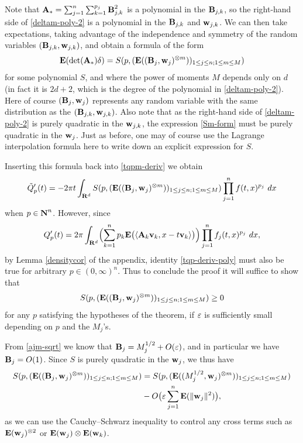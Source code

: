 Note that ${\hbox{\bf A}}_* = \sum_{j=1}^n \sum_{k=1}^{p_j} {\hbox{\bf B}}_{j,k}^2$ is a
polynomial in the ${\hbox{\bf B}}_{j,k}$, so the right-hand side of
\eqref{deltam-poly-2} is a polynomial in the ${\hbox{\bf B}}_{j,k}$ and
${\hbox{\bf w}}_{j,k}$. We can then take expectations, taking advantage of the
independence and symmetry of the random variables $({\hbox{\bf B}}_{j,k},
{\hbox{\bf w}}_{j,k})$, and obtain a formula of the form
\begin{equation}\label{Sm-form}
 {\hbox{\bf E}}(\det({\hbox{\bf A}}_*) \delta) = S(p, ({\hbox{\bf E}}( ({\hbox{\bf B}}_j, {\hbox{\bf w}}_j)^{\otimes m} ))_{1 \leq j \leq n; 1 \leq m \leq M} )
\end{equation}
for some polynomial $S$, and where the power of moments $M$
depends only on $d$ (in fact it is $2d+2$, which is the degree of
the polynomial in \eqref{deltam-poly-2}).  Here of course $({\hbox{\bf B}}_j,
{\hbox{\bf w}}_j)$ represents any random variable with the same distribution
as the $({\hbox{\bf B}}_{j,k}, {\hbox{\bf w}}_{j,k})$.  Also note that as the right-hand
side of \eqref{deltam-poly-2} is purely quadratic in the
${\hbox{\bf w}}_{j,k}$, the expression \eqref{Sm-form} must be purely quadratic in the
${\hbox{\bf w}}_j$. Just as before, one may of course use the Lagrange
interpolation formula here to write down an explicit expression
for $S$.

Inserting this formula back into \eqref{tqpm-deriv} we obtain
\begin{equation}\label{tqp-deriv-poly}
\tilde Q'_p(t) = -2\pi t \int_{{\bf R}^d}
S(p, ({\hbox{\bf E}}( ({\hbox{\bf B}}_j, {\hbox{\bf w}}_j)^{\otimes m} ))_{1 \leq j \leq n; 1 \leq m
\leq M} ) \prod_{j=1}^n f(t,x)^{p_j}\ dx
\end{equation}
when $p\in{\hbox{\bf N}}^n$.  However, since
\begin{equation*}
Q_{p}'(t)=2\pi\int_{{\bf R}^d}\Bigl(\sum_{k=1}^{n}
p_{k}{\hbox{\bf E}}\bigl(\langle
{\hbox{\bf A}}_{k}{\hbox{\bf v}}_{k},x-t{\hbox{\bf v}}_k\rangle\bigr)\Bigr)\prod_{j=1}^n f_{j}(t,x)^{p_{j}}\
dx,
\end{equation*}
by Lemma \ref{densitycor} of the appendix,
identity \eqref{tqp-deriv-poly}
must also be true for arbitrary $p\in (0,\infty)^n$.  Thus to
conclude the proof it will suffice to show that
$$ S(p, ({\hbox{\bf E}}( ({\hbox{\bf B}}_j, {\hbox{\bf w}}_j)^{\otimes m} ))_{1 \leq j \leq n;
1 \leq m \leq M} ) \geq 0$$
for any $p$ satisfying the hypotheses of the theorem, if $\varepsilon$ is
sufficiently small depending on $p$ and the $M_j$'s.

From \eqref{ajm-sqrt}
we know that ${\hbox{\bf B}}_j = M_{j}^{1/2} + O(\varepsilon)$, and in particular we have
${\hbox{\bf B}}_j = O(1)$.  Since $S$ is purely quadratic in the ${\hbox{\bf w}}_j$, we
thus have
\begin{eqnarray}\label{tony}
\begin{aligned}
S(p, ({\hbox{\bf E}}( ({\hbox{\bf B}}_j, {\hbox{\bf w}}_j)^{\otimes m} ))_{1 \leq j \leq n; 1 \leq m
\leq M} ) &= S(p, ({\hbox{\bf E}}( (M_j^{1/2}, {\hbox{\bf w}}_j)^{\otimes m} ))_{1 \leq j
\leq n; 1 \leq m \leq M} )\\& - O\bigl(\varepsilon \sum_{j=1}^n {\hbox{\bf E}}(
\|{\hbox{\bf w}}_j\|^2 )\bigr),
\end{aligned}
\end{eqnarray}
as we can use the Cauchy--Schwarz inequality to control any
cross terms such as ${\hbox{\bf E}}( {\hbox{\bf w}}_j )^{\otimes 2}$ or ${\hbox{\bf E}}({\hbox{\bf w}}_j) \otimes
{\hbox{\bf E}}({\hbox{\bf w}}_k)$.

